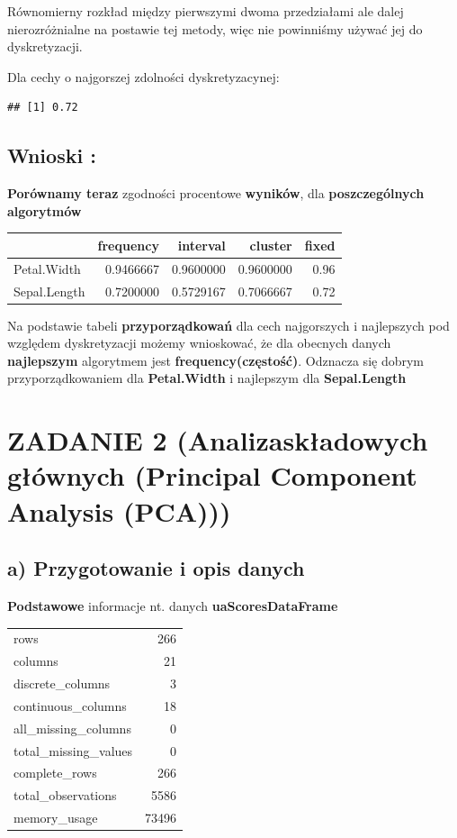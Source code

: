 \documentclass[
  12pt,
]{article}
\begin{document}
Równomierny rozkład między pierwszymi dwoma przedziałami ale dalej
nierozróżnialne na postawie tej metody, więc nie powinniśmy używać jej
do dyskretyzacji.

Dla cechy o najgorszej zdolności dyskretyzacynej:

\begin{verbatim}
## [1] 0.72
\end{verbatim}

\subsection{Wnioski :}\label{wnioski}

\textbf{Porównamy teraz} zgodności procentowe \textbf{wyników}, dla
\textbf{poszczególnych algorytmów}

\begin{longtable}[]{@{}lrrrr@{}}
\toprule\noalign{}
& frequency & interval & cluster & fixed \\
\midrule\noalign{}
\endhead
\bottomrule\noalign{}
\endlastfoot
Petal.Width & 0.9466667 & 0.9600000 & 0.9600000 & 0.96 \\
Sepal.Length & 0.7200000 & 0.5729167 & 0.7066667 & 0.72 \\
\end{longtable}

Na podstawie tabeli \textbf{przyporządkowań} dla cech najgorszych i
najlepszych pod względem dyskretyzacji możemy wnioskować, że dla
obecnych danych \textbf{najlepszym} algorytmem jest
\textbf{frequency(częstość)}. Odznacza się dobrym przyporządkowaniem dla
\textbf{Petal.Width} i najlepszym dla \textbf{Sepal.Length}

\section{ZADANIE 2 (Analizaskładowych głównych (Principal Component
Analysis
(PCA)))}\label{zadanie-2-analizaskux142adowych-gux142uxf3wnych-principal-component-analysis-pca}

\subsection{a) Przygotowanie i opis
danych}\label{a-przygotowanie-i-opis-danych}

\textbf{Podstawowe} informacje nt. danych \textbf{uaScoresDataFrame}

\begin{longtable}[]{@{}lr@{}}
\toprule\noalign{}
\endhead
\bottomrule\noalign{}
\endlastfoot
rows & 266 \\
columns & 21 \\
discrete\_columns & 3 \\
continuous\_columns & 18 \\
all\_missing\_columns & 0 \\
total\_missing\_values & 0 \\
complete\_rows & 266 \\
total\_observations & 5586 \\
memory\_usage & 73496 \\
\end{longtable}
\end{document}
